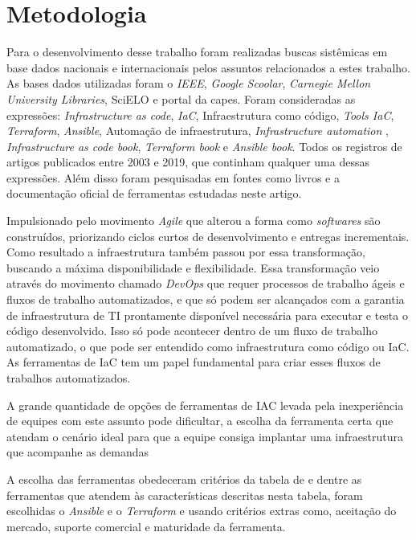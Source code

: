 \section{\esp Metodologia}

Para o desenvolvimento desse trabalho foram realizadas buscas sistêmicas em base dados nacionais e internacionais pelos assuntos relacionados a estes trabalho. As bases dados utilizadas foram o \textit{IEEE}, \textit{Google Scoolar}, \textit{Carnegie Mellon University Libraries}, SciELO e portal da capes. Foram consideradas as expressões:  \textit{Infrastructure as code}, \textit{IaC}, Infraestrutura como código, \textit{Tools IaC}, \textit{Terraform}, \textit{Ansible}, Automação de infraestrutura, \textit{Infrastructure automation} , \textit{Infrastructure as code book}, \textit{Terraform book} e \textit{Ansible book}. Todos os registros de artigos publicados entre 2003 e 2019, que continham qualquer uma dessas expressões. Além disso foram pesquisadas em fontes como livros e a documentação oficial de ferramentas estudadas neste artigo.  

Impulsionado pelo movimento \textit{Agile} que alterou a forma como \textit{softwares} são construídos, priorizando ciclos curtos de desenvolvimento e entregas incrementais. Como resultado a infraestrutura também passou por essa transformação, buscando a máxima disponibilidade e flexibilidade. Essa transformação veio através do movimento chamado \textit{DevOps} que requer processos de trabalho ágeis e fluxos de trabalho automatizados, e que só podem ser alcançados com a garantia de infraestrutura de TI prontamente disponível necessária para executar e testa o código desenvolvido. Isso só pode acontecer dentro de um fluxo de trabalho automatizado, o que pode ser entendido como infraestrutura como código ou IaC. As ferramentas de IaC tem um papel fundamental para criar esses fluxos de trabalhos automatizados.

A grande quantidade de opções de ferramentas de IAC levada pela inexperiência de equipes com este assunto pode dificultar, a escolha da ferramenta certa que atendam o cenário ideal para que a equipe consiga implantar uma infraestrutura que acompanhe as demandas 

A escolha das ferramentas obedeceram critérios da tabela de  e dentre as ferramentas que atendem às características descritas nesta tabela, foram escolhidas o \textit{Ansible} e o \textit{Terraform} e usando critérios extras como, aceitação do mercado, suporte comercial e maturidade da ferramenta.


